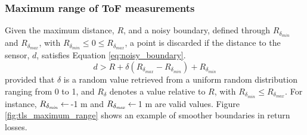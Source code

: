 
\subsubsection{Maximum range of ToF measurements}

Given the maximum distance, $R$, and a noisy boundary, defined through $R_{\delta_{\textit{min}}}$ and $R_{\delta_{\textit{max}}}$, with $R_{\delta_{\textit{min}}} \leq 0 \leq R_{\delta_{\textit{max}}}$, a point is discarded if the distance to the sensor, $d$, satisfies Equation \ref{eq:noisy_boundary}.
\begin{equation}
    \label{eq:noisy_boundary}
    d > R + \delta (R_{\delta_{\textit{max}}} - R_{\delta_{\textit{min}}}) + R_{\delta_{\textit{min}}}
\end{equation}
provided that $\delta$ is a random value retrieved from a uniform random distribution ranging from 0 to 1, and $R_{\delta}$ denotes a value relative to $R$, with $R_{\delta_{\textit{min}}} \leq R_{\delta_{\textit{max}}}$. For instance, $R_{\delta_{\textit{min}}} \gets \hspace{.5mm}$-1 \si{\meter} and $R_{\delta_{\textit{max}}} \gets \hspace{.5mm}$1 \si{\meter} are valid values. Figure \ref{fig:tls_maximum_range} shows an example of smoother boundaries in return losses.

